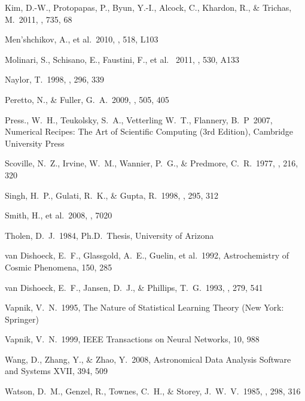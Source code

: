 \begin{thebibliography}{32}
 Kim, D.-W., Protopapas, P.,
Byun, Y.-I., Alcock, C., Khardon, R., \& Trichas, M.\ 2011, \apj, 735, 68

 Men'shchikov, A., et al.\ 2010, \aap, 518, L103


 Molinari, S., Schisano, E., Faustini, F., et al. \ 2011, \aap, 530, A133

 Naylor, T.\ 1998, \mnras, 296,
339

 Peretto, N., \& Fuller, G.~A.\ 2009, \aap, 505, 405

 Press., W.~H., Teukolsky, S.~A., Vetterling W.~T., Flannery, B.~P\ 2007, Numerical Recipes: The Art of Scientific Computing (3rd Edition), Cambridge University Press

 Scoville, N.~Z.,
Irvine, W.~M., Wannier, P.~G., \& Predmore, C.~R.\ 1977, \apj, 216, 320


 Singh, H.~P., Gulati,
R.~K., \& Gupta, R.\ 1998, \mnras, 295, 312


 Smith, H., et al.\ 2008,
\procspie, 7020


 Tholen, D.~J.\ 1984,
Ph.D.~Thesis, University of Arizona

 van Dishoeck,
E.~F., Glassgold, A.~E., Guelin, et al.\ 1992, Astrochemistry of Cosmic Phenomena, 150, 285

 van Dishoeck, E.~F., Jansen, D.~J., \& Phillips, T.~G.\ 1993, \aap, 279, 541

 Vapnik, V.~N.\ 1995, The Nature of Statistical Learning Theory (New York: Springer)

 Vapnik, V.~N.\ 1999, IEEE Transactions on Neural Networks, 10, 988

 Wang, D., Zhang, Y.,
\& Zhao, Y.\ 2008, Astronomical Data Analysis Software and Systems XVII, 394, 509

 Watson, D.~M., Genzel,
R., Townes, C.~H., \& Storey, J.~W.~V.\ 1985, \apj, 298, 316
\end{thebibliography}



